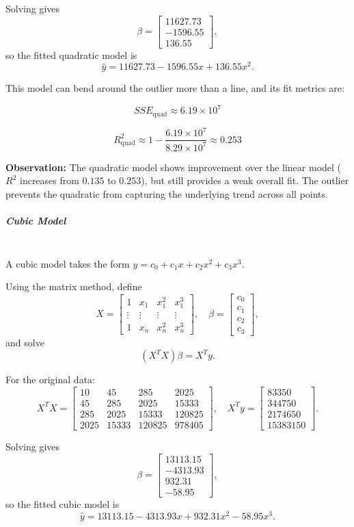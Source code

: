 Solving gives
\[
\beta =
\begin{bmatrix}
11627.73 \\
-1596.55 \\
136.55
\end{bmatrix},
\]
so the fitted quadratic model is
\[
\hat{y} = 11627.73 - 1596.55x + 136.55x^2.
\]

This model can bend around the outlier more than a line, and its fit metrics are:

\[
SSE_{\text{quad}} \approx 6.19 \times 10^7
\]

\[
R^2_{\text{quad}} \approx 1 - \frac{6.19 \times 10^7}{8.29 \times 10^7} \approx 0.253
\]

\textbf{Observation:} The quadratic model shows improvement over the linear model ($R^2$ increases from $0.135$ to $0.253$), but still provides a weak overall fit. The outlier prevents the quadratic from capturing the underlying trend across all points.

\subparagraph{Cubic Model} \mbox{} \\
A cubic model takes the form $y = c_0 + c_1 x + c_2 x^2 + c_3 x^3$.

Using the matrix method, define
\[
X = \begin{bmatrix}
1 & x_1 & x_1^2 & x_1^3 \\
\vdots & \vdots & \vdots & \vdots \\
1 & x_n & x_n^2 & x_n^3
\end{bmatrix},
\quad
\beta = \begin{bmatrix} c_0 \\ c_1 \\ c_2 \\ c_3 \end{bmatrix},
\]
and solve
\[
(X^T X)\beta = X^T y.
\]

For the original data:
\[
X^T X =
\begin{bmatrix}
10 & 45 & 285 & 2025 \\
45 & 285 & 2025 & 15333 \\
285 & 2025 & 15333 & 120825 \\
2025 & 15333 & 120825 & 978405
\end{bmatrix},
\quad
X^T y =
\begin{bmatrix}
83350 \\
344750 \\
2174650 \\
15383150
\end{bmatrix}.
\]

Solving gives
\[
\beta =
\begin{bmatrix}
13113.15 \\
-4313.93 \\
932.31 \\
-58.95
\end{bmatrix},
\]
so the fitted cubic model is
\[
\hat{y} = 13113.15 - 4313.93x + 932.31x^2 - 58.95x^3.
\]

